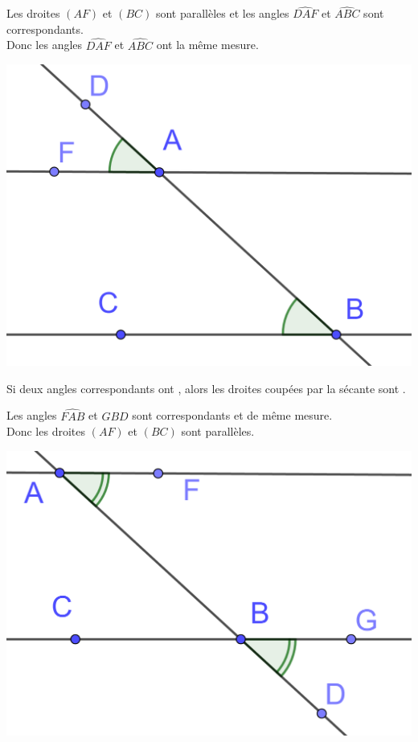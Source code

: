 \documentclass[12pt,a4paper]{article}
\begin{document}
\begin{myex}
	
	
	\begin{multicols}{2}
		Les droites $(AF)$ et $(BC)$ sont parallèles et les angles $\widehat{DAF}$ et $\widehat{ABC}$ sont correspondants. \\
		
		Donc les angles $\widehat{DAF}$ et $\widehat{ABC}$ ont la même mesure.
		
		\begin{center}
			\includegraphics[scale=0.14]{corres2}
		\end{center}
	\end{multicols}
\end{myex}


\begin{myprop}
	Si deux angles correspondants ont , alors les droites coupées par la sécante sont .
\end{myprop}

\begin{myex}
	\begin{multicols}{2}
		
		Les angles $\widehat{FAB}$ et $\widehat{GBD}$ sont correspondants et de même mesure. \\
		
		Donc les droites $(AF)$ et $(BC)$ sont parallèles.
		
		\begin{center}
			\includegraphics[scale=0.14]{corres3}
		\end{center}
	\end{multicols}
\end{myex}
\end{document}
